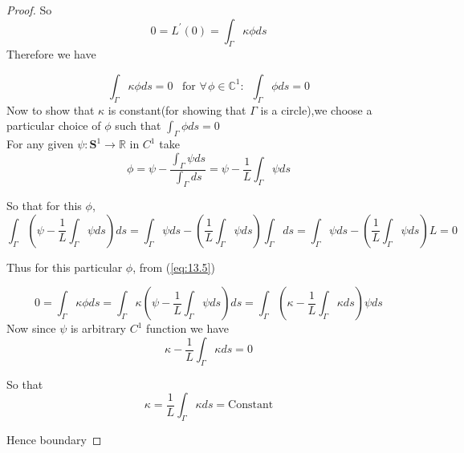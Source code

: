 \documentclass[oneside]{book}
\begin{document}
\begin{proof}
		So
		$$ 0 = L^{\prime}(0)=\int_{\Gamma} \kappa \phi d s$$
		Therefore we have 
		
		
		\begin{equation}
		\label{eq:13.5}
		\int_{\Gamma} \kappa  \phi d s=0  \hspace{6pt}   \text{ for } \forall \hspace{1pt}  \phi \in \mathbb{C}^{1} : \hspace{6pt}         \int_{\Gamma} \phi d s=0
		\end{equation}
		Now to show that $\kappa$ is constant(for showing that $\Gamma$ is a circle),we choose a particular choice of $\phi$ such that $ \int_{\Gamma} \phi d s=0$
		\\
		
		For any given $\psi: \mathbf{S}^{1} \rightarrow \mathbb{R}$ in $C^{1}$ take $$\phi = \psi - \frac{\int_{\Gamma} \psi d s }{ \int_{\Gamma} d s}
		= \psi-\frac{1}{L} \int_{\Gamma} \psi d s$$
		
		
		So that for this $\phi$, 
		$$\int_{\Gamma} \left(\psi-\frac{1}{L} \int_{\Gamma} \psi d s\right) d s = 
		\int_{\Gamma}\psi ds -  \left(\frac{1}{L} \int_{\Gamma} \psi d s\right)  \int_{\Gamma} d s  = \int_{\Gamma}\psi ds -  \left(\frac{1}{L} \int_{\Gamma} \psi ds \right)
		L  =  0 $$
		
		Thus for this particular $\phi$, from (\ref{eq:13.5})
		
		$$0 =  \int_{\Gamma} \kappa \phi d s = \int_{\Gamma} \kappa\left(\psi-\frac{1}{L} \int_{\Gamma} \psi d s\right) d s = \int_{\Gamma} \left(\kappa - \frac{1}{L} \int_{\Gamma} \kappa d s\right) \psi d s$$
		Now since $\psi$ is arbitrary $C^{1}$ function we have 
		$$ \kappa - \frac{1}{L} \int_{\Gamma} \kappa d s = 0 $$
		
		So that
		$$\kappa =
		\frac{1}{L} \int_{\Gamma}\kappa  ds = \text{Constant} $$
		
		Hence boundary 
		
		
		
	\end{proof} 
	
\end{document}

